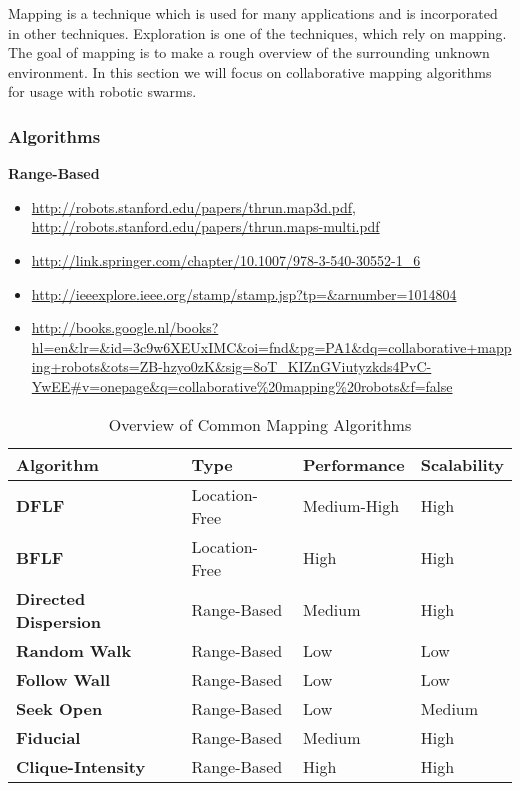 Mapping is a technique which is used for many applications and is incorporated in other techniques. Exploration is one of the techniques, which rely on mapping. The goal of mapping is to make a rough overview of the surrounding unknown environment. In this section we will focus on collaborative mapping algorithms for usage with robotic swarms.

\subsubsection{Algorithms}

\textbf{Range-Based}\\
\begin{itemize}
  \item \url{http://robots.stanford.edu/papers/thrun.map3d.pdf}, \url{http://robots.stanford.edu/papers/thrun.maps-multi.pdf}
  \item \url{http://link.springer.com/chapter/10.1007/978-3-540-30552-1_6}
  \item \url{http://ieeexplore.ieee.org/stamp/stamp.jsp?tp=&arnumber=1014804}
  \item \url{http://books.google.nl/books?hl=en&lr=&id=3c9w6XEUxIMC&oi=fnd&pg=PA1&dq=collaborative+mapping+robots&ots=ZB-hzyo0zK&sig=8oT_KIZnGViutyzkds4PvC-YwEE#v=onepage&q=collaborative%20mapping%20robots&f=false}
\end{itemize}

  \begin{table}[H]
  \renewcommand{\arraystretch}{1.3}
  \label{table_alg_mapping}
  \centering
    \begin{tabular}{|l|p{2.2cm}|p{2.2cm}|p{2.2cm}|}
    \hline
    \bfseries Algorithm & \bfseries Type & \bfseries Performance & \bfseries Scalability\\
    \hline
    \bfseries DFLF& Location-Free & Medium-High & High\\\hline
    \bfseries BFLF & Location-Free & High & High\\\hline
    \bfseries Directed Dispersion & Range-Based & Medium & High\\\hline
    \bfseries Random Walk& Range-Based & Low & Low\\\hline
    \bfseries Follow Wall& Range-Based & Low & Low\\\hline
    \bfseries Seek Open& Range-Based & Low & Medium\\\hline
    \bfseries Fiducial& Range-Based & Medium & High\\\hline
    \bfseries Clique-Intensity& Range-Based & High & High\\\hline
    \end{tabular}
  \caption{Overview of Common Mapping Algorithms}
  \end{table}

